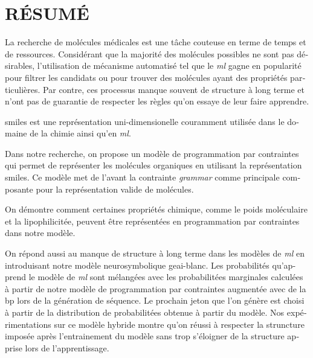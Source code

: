 \documentclass[../Document.tex]{subfiles}
\begin{document}
%
\chapter*{RÉSUMÉ}\thispagestyle{headings}

\begin{otherlanguage}{french}
La recherche de molécules médicales est une tâche couteuse en terme de temps et de ressources.
Considérant que la majorité des molécules possibles ne sont pas désirables, l'utilisation de mécanisme automatisé tel que le \textit{\acrshort{ml}} gagne en popularité pour filtrer les candidats ou pour trouver des molécules ayant des propriétés particulières.
Par contre, ces processus manque souvent de structure à long terme et n'ont pas de guarantie de respecter les règles qu'on essaye de leur faire apprendre.

\acrshort{smiles} est une représentation uni-dimensionelle couramment utilisée dans le domaine de la chimie ainsi qu'en \textit{\acrshort{ml}}. 

Dans notre recherche, on propose un modèle de programmation par contraintes qui permet de représenter les molécules organiques en utilisant la représentation \acrshort{smiles}. Ce modèle met de l'avant la contrainte \textit{grammar} comme principale composante pour la représentation valide de molécules.

On démontre comment certaines propriétés chimique, comme le poids moléculaire et la lipophilicitée, peuvent être représentées en programmation par contraintes dans notre modèle.

On répond aussi au manque de structure à long terme dans les modèles de \textit{\acrshort{ml}} en introduisant notre modèle neurosymbolique \acrshort{geai-blanc}.
Les probabilités qu'apprend le modèle de \textit{\acrshort{ml}} sont mélangées avec les probabilitées marginales calculées à partir de notre modèle de programmation par contraintes augmentée avec de la \acrshort{bp} lors de la génération de séquence.
Le prochain jeton que l'on génère est choisi à partir de la distribution de probabilitées obtenue à partir du modèle.
Nos expérimentations sur ce modèle hybride montre qu'on réussi à respecter la struncture imposée après l'entrainement du modèle sans trop s'éloigner de la structure apprise lors de l'apprentissage.

\end{otherlanguage}
\end{document}

